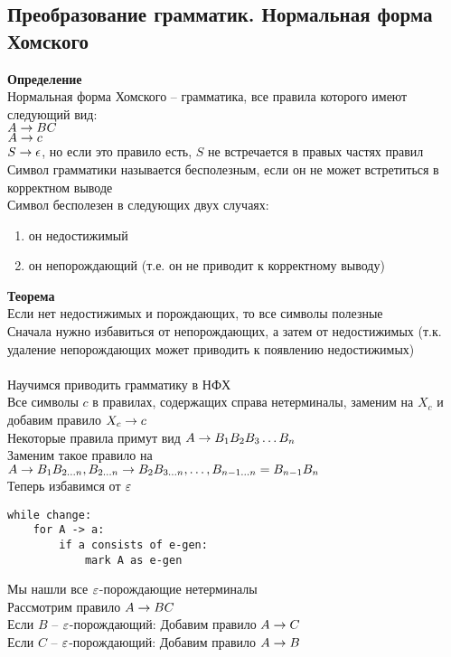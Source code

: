 \documentclass[12pt]{article}
\begin{document}
\subsection{Преобразование грамматик. Нормальная форма Хомского}
\textbf{Определение}\\
Нормальная форма Хомского -- грамматика, все правила которого имеют следующий вид:\\
$A \rightarrow BC$\\
$A \rightarrow c$\\
$S \rightarrow \epsilon$, но если это правило есть, $S$ не встречается в правых частях правил\\
Символ грамматики называется бесполезным, если он не может встретиться в корректном выводе\\
Символ бесполезен в следующих двух случаях:
\begin{enumerate}
    \item он недостижимый
    \item он непорождающий (т.е. он не приводит к корректному выводу)
\end{enumerate}
\textbf{Теорема}\\
Если нет недостижимых и порождающих, то все символы полезные\\
Сначала нужно избавиться от непорождающих, а затем от недостижимых (т.к. удаление непорождающих может приводить к появлению недостижимых)\\\\
Научимся приводить грамматику в НФХ\\
Все символы $c$ в правилах, содержащих справа нетерминалы, заменим на $X_c$ и добавим правило $X_c \rightarrow c$\\
Некоторые правила примут вид $A \rightarrow B_1 B_2 B_3 \ldots B_n$\\
Заменим такое правило на $A \rightarrow B_1 B_{2\ldots n}, B_{2\ldots n} \rightarrow B_2 B_{3\ldots n}, \ldots, B_{n-1\ldots n} = B_{n-1}B_n$\\
Теперь избавимся от $\varepsilon$\\
\begin{lstlisting}
while change:
    for A -> a:
        if a consists of e-gen:
            mark A as e-gen
\end{lstlisting}
Мы нашли все $\varepsilon$-порождающие нетерминалы\\
Рассмотрим правило $A\rightarrow BC$\\
Если $B$ -- $\varepsilon$-порождающий: Добавим правило $A\rightarrow C$\\
Если $C$ -- $\varepsilon$-порождающий: Добавим правило $A\rightarrow B$\\
\end{document}
